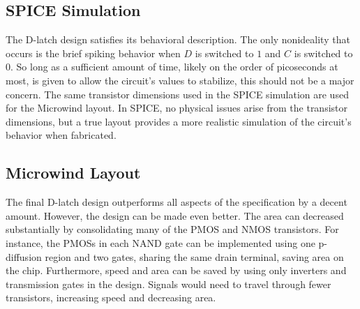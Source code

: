 \subsection{SPICE Simulation}
The D-latch design satisfies its behavioral description.
The only nonideality that occurs is the brief spiking behavior when $D$ is switched to $1$ and $C$ is switched to $0$.
So long as a sufficient amount of time, likely on the order of picoseconds at most, is given to allow the circuit's values to stabilize, this should not be a major concern.
The same transistor dimensions used in the SPICE simulation are used for the Microwind layout.
In SPICE, no physical issues arise from the transistor dimensions, but a true layout provides a more realistic simulation of the circuit's behavior when fabricated.
\subsection{Microwind Layout}
The final D-latch design outperforms all aspects of the specification by a decent amount.
However, the design can be made even better.
The area can decreased substantially by consolidating many of the PMOS and NMOS transistors.
For instance, the PMOSs in each NAND gate can be implemented using one p-diffusion region and two gates, sharing the same drain terminal, saving area on the chip.
Furthermore, speed and area can be saved by using only inverters and transmission gates in the design.
Signals would need to travel through fewer transistors, increasing speed and decreasing area.
